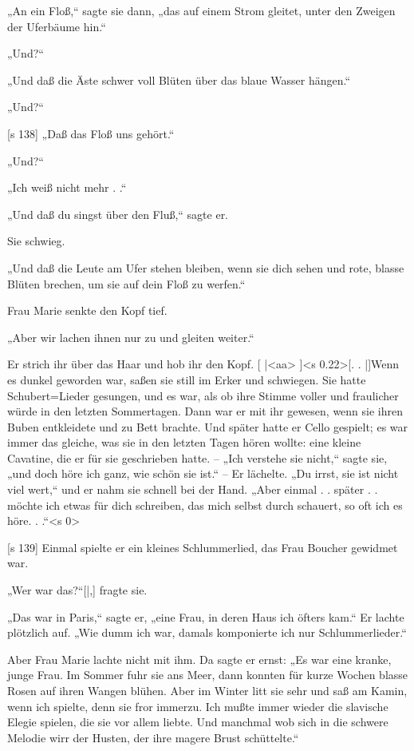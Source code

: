 „An ein Floß,“ sagte sie dann, „das auf einem
Strom gleitet, unter den Zweigen der Uferbäume hin.“

„Und?“

„Und daß die Äste schwer voll Blüten über
das blaue Wasser hängen.“

„Und?“

[s 138]
„Daß das Floß uns gehört.“

„Und?“

„Ich weiß nicht mehr . .“

„Und daß du singst über den Fluß,“ sagte er.

Sie schwieg.

„Und daß die Leute am Ufer stehen bleiben,
wenn sie dich sehen und rote, blasse Blüten brechen,
um sie auf dein Floß zu werfen.“

Frau Marie senkte den Kopf tief.

„Aber wir lachen ihnen nur zu und gleiten weiter.“

Er strich ihr über das Haar und hob ihr den Kopf.
[
|<aa>
]<s 0.22>[. . |]Wenn es dunkel geworden war, saßen sie still
im Erker und schwiegen. Sie hatte Schubert=Lieder
gesungen, und es war, als ob ihre Stimme voller
und fraulicher würde in den letzten Sommertagen.
Dann war er mit ihr gewesen, wenn sie ihren Buben
entkleidete und zu Bett brachte. Und später hatte
er Cello gespielt; es war immer das gleiche, was sie
in den letzten Tagen hören wollte: eine kleine
Cavatine, die er für sie geschrieben hatte. – „Ich
verstehe sie nicht,“ sagte sie, „und doch höre ich
ganz, wie schön sie ist.“ – Er lächelte. „Du irrst,
sie ist nicht viel wert,“ und er nahm sie schnell
bei der Hand. „Aber einmal . . später . . möchte
ich etwas für dich schreiben, das mich selbst durch­
schauert, so oft ich es höre. . .“<s 0>

[s 139]
Einmal spielte er ein kleines Schlummerlied, das
Frau Boucher gewidmet war.

„Wer war das?“[|,] fragte sie.

„Das war in Paris,“ sagte er, „eine Frau, in
deren Haus ich öfters kam.“ Er lachte plötzlich auf.
„Wie dumm ich war, damals komponierte ich nur
Schlummerlieder.“

Aber Frau Marie lachte nicht mit ihm. Da
sagte er ernst: „Es war eine kranke, junge Frau.
Im Sommer fuhr sie ans Meer, dann konnten für
kurze Wochen blasse Rosen auf ihren Wangen
blühen. Aber im Winter litt sie sehr und saß am
Kamin, wenn ich spielte, denn sie fror immerzu. Ich
mußte immer wieder die slavische Elegie spielen, die
sie vor allem liebte. Und manchmal wob sich in die
schwere Melodie wirr der Husten, der ihre magere
Brust schüttelte.“

